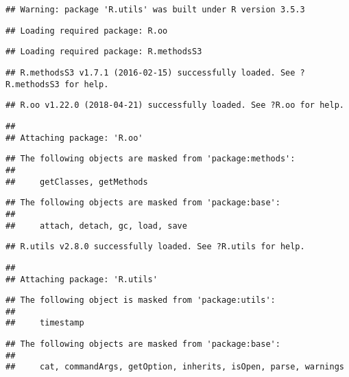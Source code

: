 \documentclass[]{article}
\begin{document}
\begin{verbatim}
## Warning: package 'R.utils' was built under R version 3.5.3
\end{verbatim}

\begin{verbatim}
## Loading required package: R.oo
\end{verbatim}

\begin{verbatim}
## Loading required package: R.methodsS3
\end{verbatim}

\begin{verbatim}
## R.methodsS3 v1.7.1 (2016-02-15) successfully loaded. See ?R.methodsS3 for help.
\end{verbatim}

\begin{verbatim}
## R.oo v1.22.0 (2018-04-21) successfully loaded. See ?R.oo for help.
\end{verbatim}

\begin{verbatim}
## 
## Attaching package: 'R.oo'
\end{verbatim}

\begin{verbatim}
## The following objects are masked from 'package:methods':
## 
##     getClasses, getMethods
\end{verbatim}

\begin{verbatim}
## The following objects are masked from 'package:base':
## 
##     attach, detach, gc, load, save
\end{verbatim}

\begin{verbatim}
## R.utils v2.8.0 successfully loaded. See ?R.utils for help.
\end{verbatim}

\begin{verbatim}
## 
## Attaching package: 'R.utils'
\end{verbatim}

\begin{verbatim}
## The following object is masked from 'package:utils':
## 
##     timestamp
\end{verbatim}

\begin{verbatim}
## The following objects are masked from 'package:base':
## 
##     cat, commandArgs, getOption, inherits, isOpen, parse, warnings
\end{verbatim}
\end{document}

